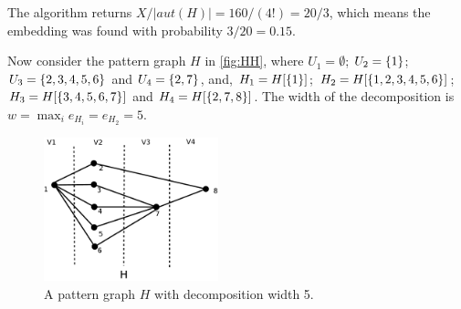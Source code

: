 \documentclass[a4paper,english,12pt,]{scrartcl}
\begin{document}
The algorithm returns $X/|aut(H)|=160/(4!)=20/3$, which means the embedding was found with probability $3/20=0.15$.

 \clearpage

Now consider the pattern graph $H$ in \autoref{fig:HH}, where $U_1 = \emptyset{}$; $U_2 = \{1\}$; $U_3 = \{2,3,4,5,6\}$ and $U_4 = \{2,7\}$, and,
$H_1=H[\{1\}]$; $H_2=H[\{1,2,3,4,5,6\}]$; $H_3 = H[\{3,4,5,6,7\}]$ and $H_4 = H[\{2,7,8\}]$.
The width of the decomposition is $w=\max_i e_{H_i} = e_{H_2}=5$.

\begin{figure}[bp]
 \centering
 \includegraphics[width=0.45\textwidth]{./examples/H}
  \caption{A pattern graph $H$ with decomposition width 5. \label{fig:HH}}
\end{figure}
\end{document}

